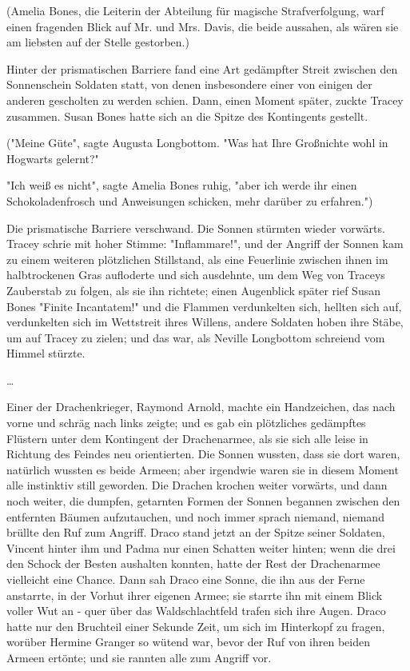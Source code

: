 {(Amelia Bones, die Leiterin der Abteilung für magische Strafverfolgung, warf einen fragenden Blick auf Mr. und Mrs. Davis, die beide aussahen, als wären sie am liebsten auf der Stelle gestorben.)

Hinter der prismatischen Barriere fand eine Art gedämpfter Streit zwischen den Sonnenschein Soldaten statt, von denen insbesondere einer von einigen der anderen gescholten zu werden schien. Dann, einen Moment später, zuckte Tracey zusammen. Susan Bones hatte sich an die Spitze des Kontingents gestellt.

("Meine Güte", sagte Augusta Longbottom. "Was hat Ihre Großnichte wohl in Hogwarts gelernt?"

"Ich weiß es nicht", sagte Amelia Bones ruhig, "aber ich werde ihr einen Schokoladenfrosch und Anweisungen schicken, mehr darüber zu erfahren.")

Die prismatische Barriere verschwand. Die Sonnen stürmten wieder vorwärts. Tracey schrie mit hoher Stimme: "Inflammare!", und der Angriff der Sonnen kam zu einem weiteren plötzlichen Stillstand, als eine Feuerlinie zwischen ihnen im halbtrockenen Gras aufloderte und sich ausdehnte, um dem Weg von Traceys Zauberstab zu folgen, als sie ihn richtete; einen Augenblick später rief Susan Bones "Finite Incantatem!" und die Flammen verdunkelten sich, hellten sich auf, verdunkelten sich im Wettstreit ihres Willens, andere Soldaten hoben ihre Stäbe, um auf Tracey zu zielen; und das war, als Neville Longbottom schreiend vom Himmel stürzte.

…

Einer der Drachenkrieger, Raymond Arnold, machte ein Handzeichen, das nach vorne und schräg nach links zeigte; und es gab ein plötzliches gedämpftes Flüstern unter dem Kontingent der Drachenarmee, als sie sich alle leise in Richtung des Feindes neu orientierten. Die Sonnen wussten, dass sie dort waren, natürlich wussten es beide Armeen; aber irgendwie waren sie in diesem Moment alle instinktiv still geworden. Die Drachen krochen weiter vorwärts, und dann noch weiter, die dumpfen, getarnten Formen der Sonnen begannen zwischen den entfernten Bäumen aufzutauchen, und noch immer sprach niemand, niemand brüllte den Ruf zum Angriff. Draco stand jetzt an der Spitze seiner Soldaten, Vincent hinter ihm und Padma nur einen Schatten weiter hinten; wenn die drei den Schock der Besten aushalten konnten, hatte der Rest der Drachenarmee vielleicht eine Chance. Dann sah Draco eine Sonne, die ihn aus der Ferne anstarrte, in der Vorhut ihrer eigenen Armee; sie starrte ihn mit einem Blick voller Wut an - quer über das Waldschlachtfeld trafen sich ihre Augen. Draco hatte nur den Bruchteil einer Sekunde Zeit, um sich im Hinterkopf zu fragen, worüber Hermine Granger so wütend war, bevor der Ruf von ihren beiden Armeen ertönte; und sie rannten alle zum Angriff vor.

}
